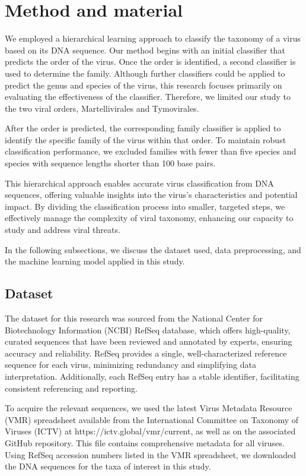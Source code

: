 \section {Method and material}

We employed a hierarchical learning approach to classify the taxonomy of a virus based on its DNA sequence. Our method begins with an initial classifier that predicts the order of the virus. Once the order is identified, a second classifier is used to determine the family. Although further classifiers could be applied to predict the genus and species of the virus, this research focuses primarily on evaluating the effectiveness of the classifier. Therefore, we limited our study to the two viral orders, Martellivirales and Tymovirales.

After the order is predicted, the corresponding family classifier is applied to identify the specific family of the virus within that order. To maintain robust classification performance, we excluded families with fewer than five species and species with sequence lengths shorter than 100 base pairs.

This hierarchical approach enables accurate virus classification from DNA sequences, offering valuable insights into the virus’s characteristics and potential impact. By dividing the classification process into smaller, targeted steps, we effectively manage the complexity of viral taxonomy, enhancing our capacity to study and address viral threats.

In the following subsections, we discuss the dataset used, data preprocessing, and the machine learning model applied in this study.

\subsection{Dataset}
\label{sec:obj:det}

The dataset for this research was sourced from the National Center for Biotechnology Information (NCBI) RefSeq database, which offers high-quality, curated sequences that have been reviewed and annotated by experts, ensuring accuracy and reliability. RefSeq provides a single, well-characterized reference sequence for each virus, minimizing redundancy and simplifying data interpretation. Additionally, each RefSeq entry has a stable identifier, facilitating consistent referencing and reporting.

To acquire the relevant sequences, we used the latest Virus Metadata Resource (VMR) spreadsheet available from the International Committee on Taxonomy of Viruses (ICTV) at https://ictv.global/vmr/current, as well as on the associated GitHub repository. This file contains comprehensive metadata for all viruses. Using RefSeq accession numbers listed in the VMR spreadsheet, we downloaded the DNA sequences for the taxa of interest in this study.

